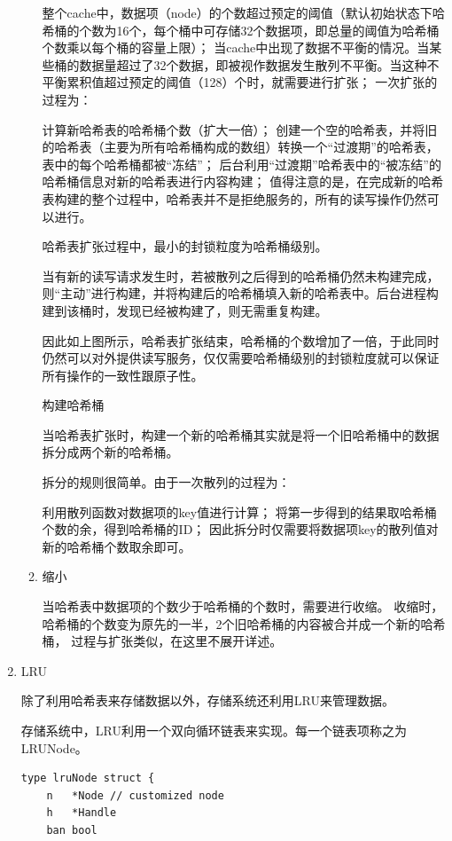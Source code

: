 \begin{enumerate}
\begin{enumerate}
整个cache中，数据项（node）的个数超过预定的阈值（默认初始状态下哈希桶的个数为16个，每个桶中可存储32个数据项，即总量的阈值为哈希桶个数乘以每个桶的容量上限）；
当cache中出现了数据不平衡的情况。当某些桶的数据量超过了32个数据，即被视作数据发生散列不平衡。当这种不平衡累积值超过预定的阈值（128）个时，就需要进行扩张；
一次扩张的过程为：

计算新哈希表的哈希桶个数（扩大一倍）；
创建一个空的哈希表，并将旧的哈希表（主要为所有哈希桶构成的数组）转换一个“过渡期”的哈希表，表中的每个哈希桶都被“冻结”；
后台利用“过渡期”哈希表中的“被冻结”的哈希桶信息对新的哈希表进行内容构建；
值得注意的是，在完成新的哈希表构建的整个过程中，哈希表并不是拒绝服务的，所有的读写操作仍然可以进行。

哈希表扩张过程中，最小的封锁粒度为哈希桶级别。

当有新的读写请求发生时，若被散列之后得到的哈希桶仍然未构建完成，则“主动”进行构建，并将构建后的哈希桶填入新的哈希表中。后台进程构建到该桶时，发现已经被构建了，则无需重复构建。

因此如上图所示，哈希表扩张结束，哈希桶的个数增加了一倍，于此同时仍然可以对外提供读写服务，仅仅需要哈希桶级别的封锁粒度就可以保证所有操作的一致性跟原子性。

构建哈希桶

当哈希表扩张时，构建一个新的哈希桶其实就是将一个旧哈希桶中的数据拆分成两个新的哈希桶。

拆分的规则很简单。由于一次散列的过程为：

利用散列函数对数据项的key值进行计算；
将第一步得到的结果取哈希桶个数的余，得到哈希桶的ID；
因此拆分时仅需要将数据项key的散列值对新的哈希桶个数取余即可。
				
				\item 缩小 
				
				当哈希表中数据项的个数少于哈希桶的个数时，需要进行收缩。
				收缩时，哈希桶的个数变为原先的一半，2个旧哈希桶的内容被合并成一个新的哈希桶，
				过程与扩张类似，在这里不展开详述。

			\end{enumerate}
		
		\item LRU 
		
		除了利用哈希表来存储数据以外，存储系统还利用LRU来管理数据。

存储系统中，LRU利用一个双向循环链表来实现。每一个链表项称之为LRUNode。

\begin{lstlisting}[caption=lruNode , label=code_radds_storage_lruNode]
type lruNode struct {
	n   *Node // customized node
	h   *Handle
	ban bool


\end{lstlisting}
\end{enumerate}
